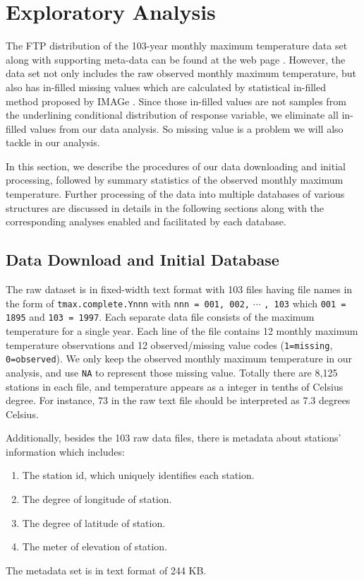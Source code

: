 \section{Exploratory Analysis}

The FTP distribution of the 103-year monthly maximum temperature data set along
with supporting meta-data can be found at the web page \cite{data}. 
However, the data set not only includes the raw observed monthly
maximum temperature, but also has in-filled missing values which are calculated 
by statistical in-filled method proposed by IMAGe \cite{data}. Since those 
in-filled values are not samples from the underlining  conditional distribution
of response variable, we eliminate all in-filled values from our data analysis. 
So missing value is a problem we will also tackle in our analysis.

In this section, we describe the procedures of our data downloading and initial 
processing, followed by summary statistics of the observed monthly maximum 
temperature. Further processing of the data into multiple databases of various 
structures are discussed in details in the following sections along with the 
corresponding analyses enabled and facilitated by each database.

\subsection{Data Download and Initial Database}
\label{sec:Download}

The raw dataset is in fixed-width text format with 103 files having file names 
in the form of \texttt{tmax.complete.Ynnn} with \texttt{nnn = 001, 002,} $\cdots$
\texttt{, 103} which \texttt{001 = 1895} and \texttt{103 = 1997}. Each separate 
data file consists of the maximum temperature for a single year. Each line of the 
file contains 12 monthly maximum temperature observations and 12 observed/missing 
value codes (\texttt{1=missing}, \texttt{0=observed}). We only keep the observed 
monthly maximum temperature in our analysis, and use \texttt{NA} to represent
those missing value. Totally there are 8,125 stations in each file, and 
temperature appears as a integer in tenths of Celsius degree. For instance, 73 
in the raw text file should be interpreted as 7.3 degrees Celsius. 

Additionally, besides the 103 raw data files, there is metadata about stations' 
information which includes:
\begin{enumerate}
  \item The station id, which uniquely identifies each station.
  \item The degree of longitude of station.
  \item The degree of latitude of station.
  \item The meter of elevation of station.
\end{enumerate}
The metadata set is in text format of 244 KB.

